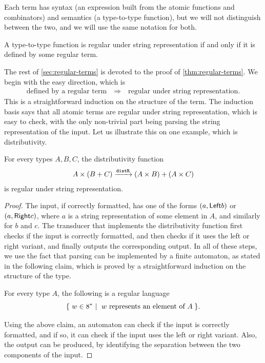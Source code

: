 Each term has syntax (an expression built from the atomic functions and combinators) and semantics (a type-to-type function), but we will not distinguish between the two, and we will use the same notation for both. 

\begin{theorem}\label{thm:regular-terms} A type-to-type function is regular under string representation if and only if it is defined by some regular term.
\end{theorem}

The rest of \cref{sec:regular-terms} is devoted to the proof of \cref{thm:regular-terms}.  We begin with the easy direction, which is
\begin{align*}
\text{defined by a regular term} 
\quad \Rightarrow \quad 
\text{regular under string representation.}
\end{align*}
This is a straightforward induction on the structure of the term. The induction basis says that all atomic terms are regular under string representation, which is easy to check, with the only  non-trivial part being  parsing the string representation of the input. Let us illustrate this on one example, which is distributivity.

\begin{lemma}
    For every types $A,B,C$, the distributivity function
    \begin{align*}
    A \times (B + C) \xrightarrow {\mathtt{distR}} (A \times B) + (A \times C)
    \end{align*}
    is regular under string representation.
\end{lemma}
\begin{proof}
    The input, if correctly formatted, has one of the forms $(a, \mathsf{Left} b)$ or $(a, \mathsf{Right} c)$, where $a$ is a string representation of some element in $A$, and similarly for $b$ and $c$.      The transducer that implements the distributivity function first checks if the input is correctly formatted, and then checks if it uses the left or right variant, and finally outputs the corresponding output. In all of these steps, we use the fact that parsing can be implemented by a finite automaton, as stated in the following claim, which is proved by a straightforward induction on the structure of the type. 
        \begin{claim}
        For every type $A$, the following is a regular language
        \begin{align*}
        \setbuild{ w \in 8^*}{$w$ represents an element of $A$}.
        \end{align*}
    \end{claim}
    Using the above claim, an automaton can check if the input is correctly formatted, and if so, it can check if the input uses the left or right variant. Also, the output can be produced, by identifying the separation between the two components of the input. 
\end{proof}

